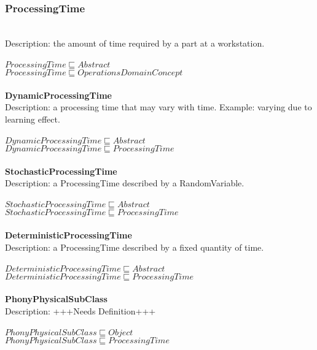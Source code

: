 \subsubsection{ProcessingTime}\\
Description: the amount of time required by a part at a workstation.\\
\\$ ProcessingTime \sqsubseteq Abstract$
\\$ ProcessingTime \sqsubseteq OperationsDomainConcept$
\\\\   \textbf{DynamicProcessingTime}\\Description: a processing time that may vary with time. Example: varying due to learning effect. \cite{Boysen2008}\\
\\$ DynamicProcessingTime \sqsubseteq Abstract$
\\$ DynamicProcessingTime \sqsubseteq ProcessingTime$
\\\\   \textbf{StochasticProcessingTime}\\Description: a ProcessingTime described by a RandomVariable.\\
\\$ StochasticProcessingTime \sqsubseteq Abstract$
\\$ StochasticProcessingTime \sqsubseteq ProcessingTime$
\\\\   \textbf{DeterministicProcessingTime}\\Description: a ProcessingTime described by a fixed quantity of time.\\
\\$ DeterministicProcessingTime \sqsubseteq Abstract$
\\$ DeterministicProcessingTime \sqsubseteq ProcessingTime$
\\\\   \textbf{PhonyPhysicalSubClass}\\Description: +++Needs Definition+++\\
\\$ PhonyPhysicalSubClass \sqsubseteq Object$
\\$ PhonyPhysicalSubClass \sqsubseteq ProcessingTime$

